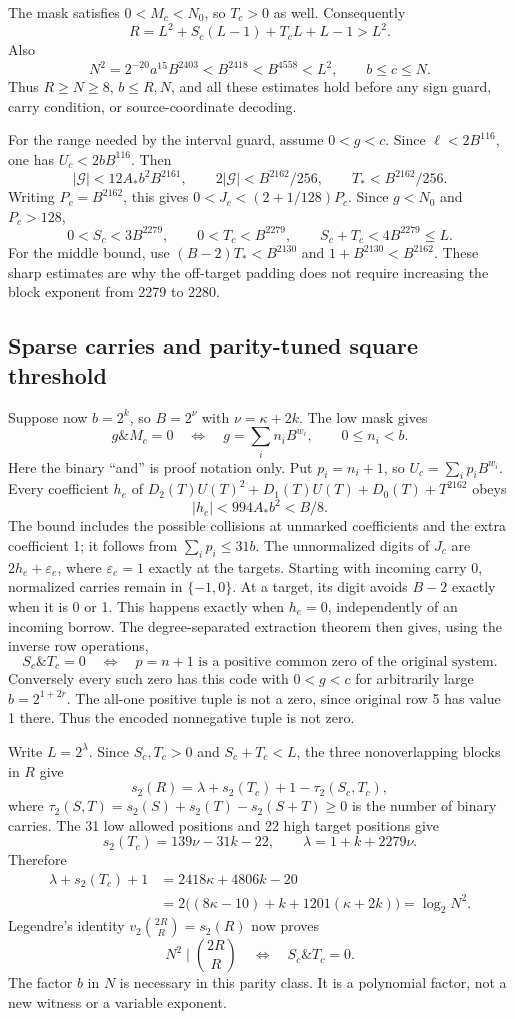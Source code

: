 The mask satisfies $0<M_c<N_0$, so $T_c>0$ as well. Consequently
\[
 R=L^2+S_c(L-1)+T_cL+L-1>L^2.
\]
Also
\[
 N^2=2^{-20}a^{15}B^{2403}<B^{2418}<B^{4558}<L^2,
 \qquad b\le c\le N.
\]
Thus $R\ge N\ge8$, $b\le R,N$, and all these estimates hold before any
sign guard, carry condition, or source-coordinate decoding.

For the range needed by the interval guard, assume $0<g<c$.
Since $\ell<2B^{116}$, one has $U_c<2bB^{116}$. Then
\[
 |\mathcal G|<12A_*b^2B^{2161},\qquad
 2|\mathcal G|<B^{2162}/256,\qquad T_*<B^{2162}/256.
\]
Writing $P_c=B^{2162}$, this gives
$0<J_c<(2+1/128)P_c$. Since $g<N_0$ and $P_c>128$,
\[
 0<S_c<3B^{2279},\qquad 0<T_c<B^{2279},\qquad
 S_c+T_c<4B^{2279}\le L.
\]
For the middle bound, use $(B-2)T_*<B^{2130}$ and
$1+B^{2130}<B^{2162}$. These sharp estimates are why the off-target padding
does not require increasing the block exponent from 2279 to 2280.

\subsection{Sparse carries and parity-tuned square threshold}
Suppose now $b=2^k$, so $B=2^\nu$ with $\nu=\kappa+2k$.
The low mask gives
\[
 g\mathbin{\&}M_c=0\quad\Longleftrightarrow\quad
 g=\sum_i n_i B^{w_i},\qquad0\le n_i<b.
\]
Here the binary ``and'' is proof notation only. Put $p_i=n_i+1$, so
$U_c=\sum_i p_iB^{w_i}$. Every coefficient $h_e$ of
$D_2(T)U(T)^2+D_1(T)U(T)+D_0(T)+T^{2162}$ obeys
\[
 |h_e|<994A_*b^2<B/8.
\]
The bound includes the possible collisions at unmarked coefficients and the
extra coefficient 1; it follows from $\sum_i p_i\le31b$.
The unnormalized digits of $J_c$ are $2h_e+\varepsilon_e$, where
$\varepsilon_e=1$ exactly at the targets. Starting with incoming carry 0,
normalized carries remain in $\{-1,0\}$. At a target, its digit avoids
$B-2$ exactly when it is 0 or 1. This happens exactly when $h_e=0$,
independently of an incoming borrow. The degree-separated extraction theorem
then gives, using the inverse row operations,
\[
 S_c\mathbin{\&}T_c=0\quad\Longleftrightarrow\quad
 p=n+1\text{ is a positive common zero of the original system}.
\]
Conversely every such zero has this code with $0<g<c$ for arbitrarily large
$b=2^{1+2r}$. The all-one positive tuple is not a zero, since original row 5
has value 1 there. Thus the encoded nonnegative tuple is not zero.

Write $L=2^\lambda$. Since $S_c,T_c>0$ and $S_c+T_c<L$, the three
nonoverlapping blocks in $R$ give
\[
 s_2(R)=\lambda+s_2(T_c)+1-\tau_2(S_c,T_c),
\]
where $\tau_2(S,T)=s_2(S)+s_2(T)-s_2(S+T)\ge0$ is the number of binary
carries. The 31 low allowed positions and 22 high target positions give
\[
 s_2(T_c)=139\nu-31k-22,\qquad\lambda=1+k+2279\nu.
\]
Therefore
\begin{align*}
 \lambda+s_2(T_c)+1
 &=2418\kappa+4806k-20\\
 &=2\bigl((8\kappa-10)+k+1201(\kappa+2k)\bigr)=\log_2N^2.
\end{align*}
Legendre's identity $v_2\binom{2R}{R}=s_2(R)$ now proves
\[
 N^2\mid\binom{2R}{R}\quad\Longleftrightarrow\quad
 S_c\mathbin{\&}T_c=0.
\]
The factor $b$ in $N$ is necessary in this parity class. It is a polynomial
factor, not a new witness or a variable exponent.

